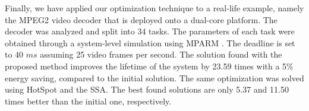 Finally, we have applied our optimization technique to a real-life example, namely the MPEG2 video decoder \cite{ffmpeg2011} that is deployed onto a dual-core platform. The decoder was analyzed and split into 34 tasks. The parameters of each task were obtained through a system-level simulation using MPARM \cite{benini2005}. The deadline is set to 40 $ms$ assuming 25 video frames per second. The solution found with the proposed method improves the lifetime of the system by 23.59 times with a 5\% energy saving, compared to the initial solution. The same optimization was solved using HotSpot and the SSA. The best found solutions are only 5.37 and 11.50 times better than the initial one, respectively.
